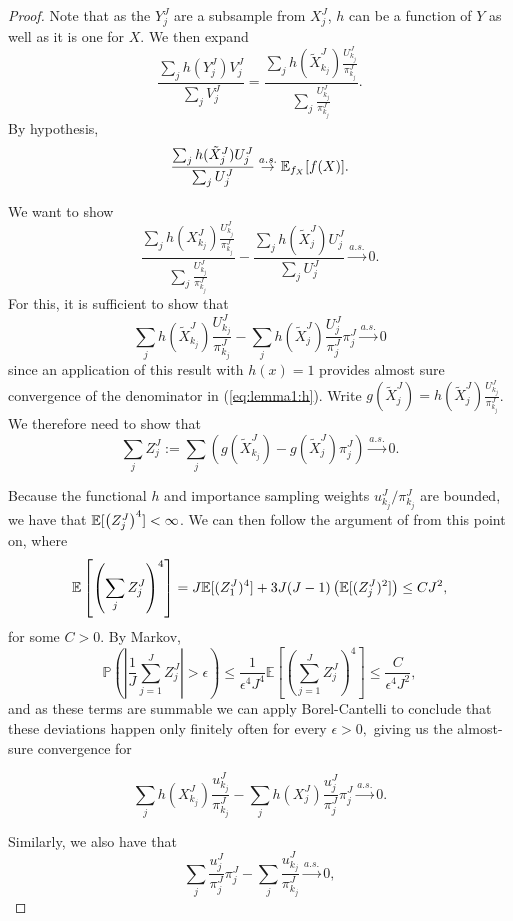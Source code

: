 \documentclass{article}
\begin{document}
\begin{proof}


    Note that as the $Y_j^J$ are a subsample from $X_j^J$, $h$ can be a function of $Y$ as well as it is one for $X$. We then expand
    $$\frac{\sum_j h(Y_j^J) V_j^J}{\sum_j V_j^J} = \frac{\sum_j h(\tilde X_{k_j}^J)\frac{U_{k_j}^J}{\pi_{k_j}^J}}{\sum_j \frac{U_{k_j}^J}{\pi_{k_j}^J}}.$$
    By hypothesis,
    $$\frac{\sum_j h(\tilde X_j^J)U_j^J}{\sum_j U_j^J} \stackrel{a.s.}{\to} \mathbb{E}_{f_X}[f(X)].$$

    We want to show
    \begin{equation}\label{eq:lemma1:h}
    \frac{\sum_j h(X_{k_j}^J)\frac{U_{k_j}^J}{\pi_{k_j}^J}}{\sum_j \frac{U_{k_j}^J}{\pi_{k_j}^J}} - \frac{\sum_j h(\tilde X_j^J)U_j^J}{\sum_j U_j^J} \stackrel{a.s.}{\to} 0.
    \end{equation}
    For this, it is sufficient to show that
   $$ \sum_j h(\tilde X_{k_j}^J)\frac{U_{k_j}^J}{\pi_{k_j}^J}
    -  \sum_j h(\tilde X_j^J)\frac{U_j^J}{\pi_j^J}\pi_j^J \stackrel{a.s.}{\to} 0 $$
    since an application of this result with $h(x)=1$ provides almost sure convergence of the denominator in (\ref{eq:lemma1:h}).
    Write $g(\tilde X_j^J) = h(\tilde X_j^J)\frac{U_{k_j}^J}{\pi_{k_j}^J}$. We therefore need to show that 
    $$\sum_j Z_j^J := \sum_j \left(g(\tilde X_{k_j}^J) -  g(\tilde X_j^J) \pi_j^J \right) \stackrel{a.s.}{\to} 0.$$

    Because the functional $h$ and importance sampling weights $u_{k_j}^J/\pi_{k_j}^J$ are bounded, we have that $\mathbb{E}[\left(Z_j^J\right)^4] < \infty$. We can then follow the argument of \cite{chopin20} from this point on, where 
    $$\mathbb{E}\left[\left(\sum_j Z_j^J\right)^4\right] 
    = J\mathbb{E}[(Z_1^J)^4] + 3J(J-1)\left(\mathbb{E}[(Z_j^J)^2]\right) \leq CJ^2,$$ for some $C>0$. By Markov, 
    $$\mathbb{P}\left(\left|\frac{1}{J} \sum_{j=1}^J Z_j^J\right|>\epsilon\right) 
    \leq \frac{1}{\epsilon^4J^4 } 
    \mathbb{E}\left[\left(\sum_{j=1}^J Z_j^J\right)^4\right] \leq \frac{C}{\epsilon^4J^2},$$
    and as these terms are summable we can apply Borel-Cantelli to conclude that these deviations happen only finitely often for every $\epsilon>0,$ giving us the almost-sure convergence for
    
    $$ \sum_j h(X_{k_j}^J)\frac{u_{k_j}^J}{\pi_{k_j}^J}
    -  \sum_j h(X_j^J)\frac{u_j^J}{\pi_j^J}\pi_j^J \stackrel{a.s.}{\to} 0.$$ 

    Similarly, we also have that
    $$ \sum_j \frac{u_j^J}{\pi_j^J}\pi_j^J
    - \sum_j \frac{u_{k_j}^J}{\pi_{k_j}^J} \stackrel{a.s.}{\to} 0,$$


\end{proof}
\end{document}
